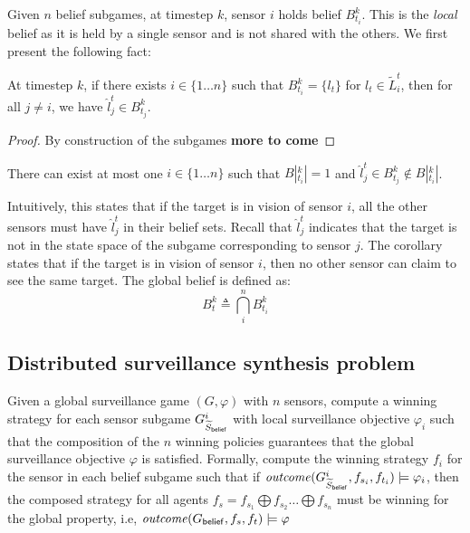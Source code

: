 Given $n$ belief subgames, at timestep $k$, sensor $i$ holds belief $B^k_{t_i}$. This is the \emph{local} belief as it is held by a single sensor and is not shared with the others. We first present the following fact: 
\begin{theorem} 
At timestep $k$, if there exists $i\in \{1\dots n\}$ such that $B^k_{t_i} = \{l_t\}$ for $l_t \in \widetilde{L}_i^t$, then for all $j \neq i$, we have $\hat{l}^t_j \in B^k_{t_j}$.
\end{theorem}
\begin{proof}
By construction of the subgames \textbf{more to come}
\end{proof}
\begin{corollary}\label{corr:uniqi}
There can exist at most one $i\in \{1\dots n\}$ such that $B|^k_{t_i}| = 1$ and $\hat{l}^t_j \in B^k_{t_j} \notin B|^k_{t_i}|$.
\end{corollary}
Intuitively, this states that if the target is in vision of sensor $i$, all the other sensors must have $\hat{l}^t_j$ in their belief sets. Recall that $\hat{l}^t_j$ indicates that the target is not in the state space of the subgame corresponding to sensor $j$. The corollary states that if the target is in vision of sensor $i$, then no other sensor can claim to see the same target. 
The global belief is defined as:
\[B^k_t \triangleq 
\bigcap_{i}^n B^k_{t_i}
\]

 




\subsection{Distributed surveillance synthesis problem}
Given a global surveillance game $(G,\varphi)$ with $n$ sensors, compute a winning strategy for each sensor subgame $G^{i}_{\widetilde{S}_{\mathsf{belief}}}$ with local surveillance objective $\varphi_i$ such that the composition of the $n$ winning policies guarantees that the global surveillance objective $\varphi$ is satisfied. Formally, compute the winning strategy $f_i$ for the sensor in each belief subgame such that if $\mathit{outcome}(G^{i}_{\widetilde{S}_{\mathsf{belief}}},f_{s_i},f_{t_i}) \models \varphi_i$, then the composed strategy for all agents $f_s = f_{s_1} \bigoplus f_{s_2} \dots \bigoplus f_{s_n}$ must be winning for the global property, i.e, $\mathit{outcome}(G_{\mathsf{belief}},f_{s},f_{t}) \models \varphi$





